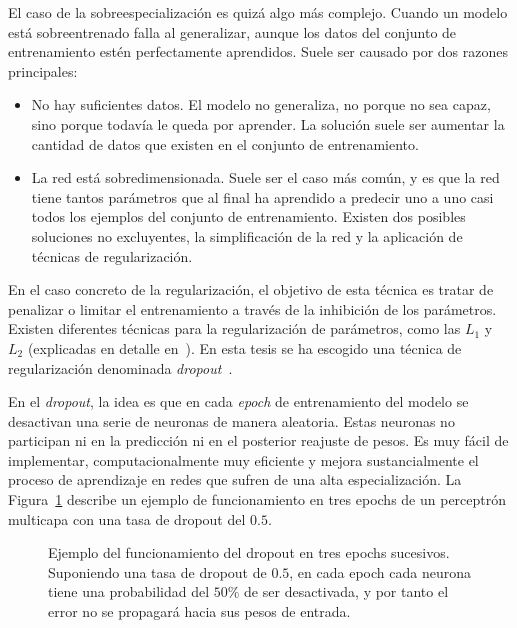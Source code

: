 El caso de la sobreespecialización es quizá algo más complejo. Cuando un modelo está sobreentrenado falla al generalizar, aunque los datos del conjunto de entrenamiento estén perfectamente aprendidos. Suele ser causado por dos razones principales:

\begin{itemize}
	\item No hay suficientes datos. El modelo no generaliza, no porque no sea capaz, sino porque todavía le queda por aprender. La solución suele ser aumentar la cantidad de datos que existen en el conjunto de entrenamiento.
	\item La red está sobredimensionada. Suele ser el caso más común, y es que la red tiene tantos parámetros que al final ha aprendido a predecir uno a uno casi todos los ejemplos del conjunto de entrenamiento. Existen dos posibles soluciones no excluyentes, la simplificación de la red y la aplicación de técnicas de regularización.
\end{itemize}

En el caso concreto de la regularización, el objetivo de esta técnica es tratar de penalizar o limitar el entrenamiento a través de la inhibición de los parámetros. Existen diferentes técnicas para la regularización de parámetros, como las $L_1$ y $L_2$ (explicadas en detalle en~\cite{ng2004feature}). En esta tesis se ha escogido una técnica de regularización denominada \textit{dropout}~\cite{srivastava2014dropout}.

En el \textit{dropout}, la idea es que en cada \textit{epoch} de entrenamiento del modelo se desactivan una serie de neuronas de manera aleatoria. Estas neuronas no participan ni en la predicción ni en el posterior reajuste de pesos. Es muy fácil de implementar, computacionalmente muy eficiente y mejora sustancialmente el proceso de aprendizaje en redes que sufren de una alta especialización. La Figura~\ref{fig:dropout-example} describe un ejemplo de funcionamiento en tres epochs de un perceptrón multicapa con una tasa de dropout del $0.5$.

\begin{figure}
	\centering
	\qquad
	\qquad
	\caption[Ejemplo de la operación de dropout para tres epochs sucesivos]{Ejemplo del funcionamiento del dropout en tres epochs sucesivos. Suponiendo una tasa de dropout de $0.5$, en cada epoch cada neurona tiene una probabilidad del $50\%$ de ser desactivada, y por tanto el error no se propagará hacia sus pesos de entrada.}
	\label{fig:dropout-example}
\end{figure}

